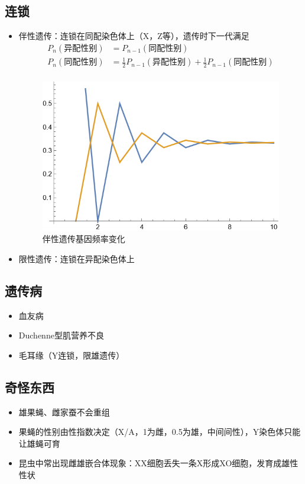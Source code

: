 \documentclass[a4paper, 12pt]{report}
\begin{document}
  \subsection{连锁}
  \begin{itemize}
    \item 伴性遗传：连锁在同配染色体上（X，Z等），遗传时下一代满足
    \[
    \begin{aligned}
      P_n(\text{异配性别})&=P_{n-1}(\text{同配性别})\\
      P_n(\text{同配性别})&=\frac{1}{2}P_{n-1}(\text{异配性别})+\frac{1}{2}P_{n-1}(\text{同配性别})\\
    \end{aligned}
    \]
    \begin{figure}[htbp]
      \centering
      \includegraphics{image.png}
      \caption{伴性遗传基因频率变化}
      \label{伴性遗传}
    \end{figure}
    \item 限性遗传：连锁在异配染色体上
  \end{itemize}
  \subsection{遗传病}
  \begin{itemize}
    \item 血友病
    \item Duchenne型肌营养不良
    \item 毛耳缘（Y连锁，限雄遗传）
  \end{itemize}
  \subsection{奇怪东西}
  \begin{itemize}
    \item 雄果蝇、雌家蚕不会重组
    \item 果蝇的性别由性指数决定（X/A，1为雌，0.5为雄，中间间性），Y染色体只能让雄蝇可育
    \item 昆虫中常出现雌雄嵌合体现象：XX细胞丢失一条X形成XO细胞，发育成雄性性状
  \end{itemize}
\end{document}

